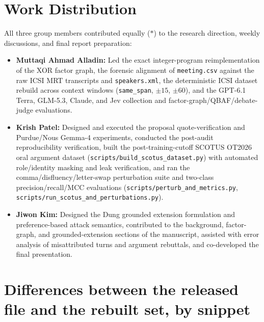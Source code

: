 \documentclass[11pt]{article}
\begin{document}


\appendix
\onecolumn

\section{Work Distribution}
\label{sec:work-distribution}

All three group members contributed equally ($*$) to the research direction, weekly discussions, and final report preparation:
\begin{itemize}
\setlength\itemsep{2pt}
\item \textbf{Muttaqi Ahmad Alladin:} Led the exact integer-program reimplementation of the \citet{wu2025power} XOR factor graph, the forensic alignment of \texttt{meeting.csv} against the raw ICSI MRT transcripts and \texttt{speakers.xml}, the deterministic ICSI dataset rebuild across context windows (\texttt{same\_span}, $\pm 15$, $\pm 60$), and the GPT-6.1 Terra, GLM-5.3, Claude, and Jev collection and factor-graph/QBAF/debate-judge evaluations.
\item \textbf{Krish Patel:} Designed and executed the proposal quote-verification and Purdue/Nous Gemma-4 experiments, conducted the post-audit reproducibility verification, built the post-training-cutoff SCOTUS OT2026 oral argument dataset (\texttt{scripts/build\_scotus\_dataset.py}) with automated role/identity masking and leak verification, and ran the comma/disfluency/letter-swap perturbation suite and two-class precision/recall/MCC evaluations (\texttt{scripts/perturb\_and\_metrics.py}, \texttt{scripts/run\_scotus\_and\_perturbations.py}).
\item \textbf{Jiwon Kim:} Designed the Dung grounded extension formulation and preference-based attack semantics, contributed to the background, factor-graph, and grounded-extension sections of the manuscript, assisted with error analysis of misattributed turns and argument rebuttals, and co-developed the final presentation.
\end{itemize}

\section{Differences between the released file and the rebuilt set, by snippet}
\label{sec:appendix}
\end{document}
